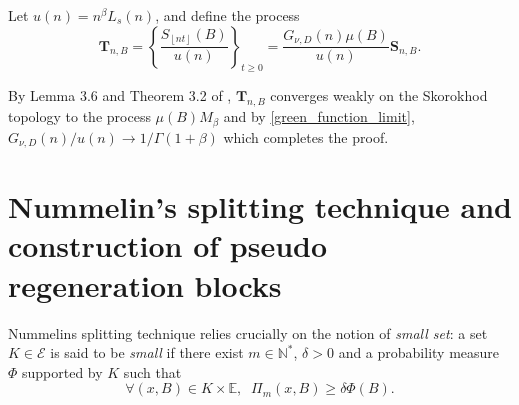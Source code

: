 \documentclass[sn-mathphys-ay]{sn-jnl}%
\newcommand{\E}{\mathbb{E}}
\newcommand{\smallSet}{K}
\begin{document}
\begin{appendices}
Let \(u\left(n\right)=n^\beta L_s\left(n\right)\), and define the process
\begin{equation*}
    {{\mathbf{T}}_{n,B}} = {\left\{ {\frac{{{S_{\left\lfloor {nt} \right\rfloor }}\left( B \right)}}{{u\left( n \right)}}} \right\}_{t \geqslant 0}} = \frac{{{G_{\nu ,D} }\left( n \right)\mu \left( B \right)}}{{u\left( n \right)}}{{\mathbf{S}}_{n,B}}.
\end{equation*}

By Lemma 3.6 and Theorem 3.2 of \cite{Tjostheim-2001}, \({{\mathbf{T}}_{n,B}}\)
converges weakly on the Skorokhod topology to the process $\mu\left(B\right)M_\beta$
and by \eqref{green_function_limit}, ${{{G_{\nu ,D}}\left( n \right)}}/{{u\left( n
            \right)}} \to {1}/{{\Gamma \left( {1 + \beta } \right)}}$ which completes the proof.

\section{Nummelin's splitting technique and construction of pseudo regeneration blocks}\label{sec:pseudo_regeneration}

Nummelins splitting technique relies crucially on the notion of \textit{small set}: a
set $K\in\mathcal{E}$ is said to be \textit{small} if there exist
$m\in\mathbb{N}^{\ast}$, $\delta>0$ and a probability measure $\Phi$ supported by
$\smallSet$ such that
\begin{equation} \label{minor}
    \forall \left(x,B\right)\in K\times \E,\;\; \Pi_{m}\left(x,B\right)\geq\delta\Phi\left(B\right).
\end{equation}


\end{appendices}
\end{document}
